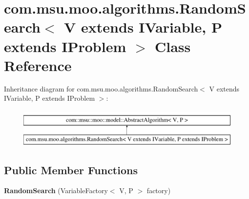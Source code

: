 \hypertarget{classcom_1_1msu_1_1moo_1_1algorithms_1_1RandomSearch_3_01V_01extends_01IVariable_00_01P_01extends_01IProblem_01_4}{\section{com.\-msu.\-moo.\-algorithms.\-Random\-Search$<$ V extends I\-Variable, P extends I\-Problem $>$ Class Reference}
\label{classcom_1_1msu_1_1moo_1_1algorithms_1_1RandomSearch_3_01V_01extends_01IVariable_00_01P_01extends_01IProblem_01_4}
}
Inheritance diagram for com.\-msu.\-moo.\-algorithms.\-Random\-Search$<$ V extends I\-Variable, P extends I\-Problem $>$\-:\begin{figure}[H]
\begin{center}
\leavevmode
\includegraphics[height=2.000000cm]{classcom_1_1msu_1_1moo_1_1algorithms_1_1RandomSearch_3_01V_01extends_01IVariable_00_01P_01extends_01IProblem_01_4}
\end{center}
\end{figure}
\subsection*{Public Member Functions}
\begin{DoxyCompactItemize}
\item 
\hypertarget{classcom_1_1msu_1_1moo_1_1algorithms_1_1RandomSearch_3_01V_01extends_01IVariable_00_01P_01extends_01IProblem_01_4_a1b39ee9d053467c6a7c98a1f1e2b5fd6}{{\bfseries Random\-Search} (Variable\-Factory$<$ V, P $>$ factory)}\label{classcom_1_1msu_1_1moo_1_1algorithms_1_1RandomSearch_3_01V_01extends_01IVariable_00_01P_01extends_01IProblem_01_4_a1b39ee9d053467c6a7c98a1f1e2b5fd6}

\end{DoxyCompactItemize}
